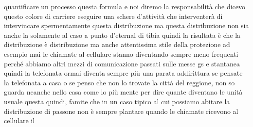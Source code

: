 quantificare un processo questa formula e noi diremo la responsabilità che dicevo questo colore di carriere eseguire una schere d'attività che interventerà di intervincare spermentamente questa distribuzione ma questa distribuzione non sia anche la solamente al caso a punto d'eternal di tibia quindi la risultata è che la distribuzione è distribuzione ma anche attentissima stile della protezione ad esempio mai le chiamate al cellulare stanno diventando sempre meno frequenti perché abbiamo altri mezzi di comunicazione passati sulle messe gs e stantanea quindi la telefonata ormai diventa sempre più una parata addirittura se pensate la telefonata a casa o se penso che non lo trovate la città del reggione, non so guarda neanche nello casa come lo più mente per dire quante diventano le unità usuale questa quindi, famite che in un caso tipico al cui possiamo abitare la distribuzione di passone non è sempre plantare quando le chiamate ricevono al cellulare il 

